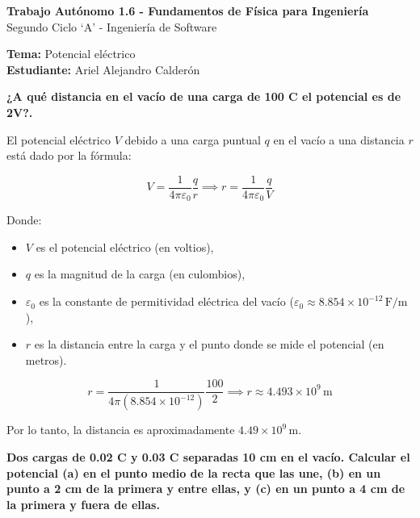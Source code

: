 \documentclass[answers]{exam} %
\begin{document}
\begin{center}
	\large\textbf{Trabajo Autónomo 1.6 - Fundamentos de Física para Ingeniería}\\[1em]
	\large Segundo Ciclo \enquote*{A} - Ingeniería de Software\\[1em]
\end{center}

\vspace{0.5cm}
\noindent
\large\textbf{Tema:} Potencial eléctrico \\
\large\textbf{Estudiante:} Ariel Alejandro Calderón 
\vspace{0.5cm}

\begin{questions}

	\question \large\textbf{¿A qué distancia en el vacío de una carga de 100 C el potencial es de 2V?.}
	\vspace{0.5cm}

	El potencial eléctrico \( V \) debido a una carga puntual \( q \) en el vacío a una distancia \( r \) está dado por la fórmula:

	\[
		V = \frac{1}{4 \pi \varepsilon_0} \frac{q}{r} \implies r = \frac{1}{4 \pi \varepsilon_0} \frac{q}{V}
	\]

	Donde:
	\begin{itemize}
		\item \( V \) es el potencial eléctrico (en voltios),
		\item \( q \) es la magnitud de la carga (en culombios),
		\item \( \varepsilon_0 \) es la constante de permitividad eléctrica del vacío (\( \varepsilon_0 \approx 8.854 \times 10^{-12} \, \text{F/m} \)),
		\item \( r \) es la distancia entre la carga y el punto donde se mide el potencial (en metros).
	\end{itemize}

	\[
		r = \frac{1}{4 \pi (8.854 \times 10^{-12})} \frac{100}{2} \implies r \approx 4.493 \times 10^9 \, \text{m}
	\]


	Por lo tanto, la distancia es aproximadamente \( 4.49 \times 10^9 \, \text{m} \).

	\vspace{0.5cm}

	\question \large\textbf{Dos cargas de 0.02 C y 0.03 C separadas 10 cm en el vacío. Calcular el potencial (a)
		en el punto medio de la recta que las une, (b) en un punto a 2 cm de la primera y
		entre ellas, y (c) en un punto a 4 cm de la primera y fuera de ellas.}


\end{questions}
\end{document}
